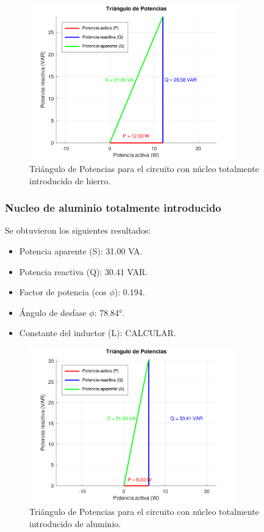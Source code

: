 \documentclass{article}
\begin{document}
            \begin{figure}[H]
                \centering
                \includegraphics[width=0.8\textwidth]{graficoTotalHierro.png}
                \caption{Triángulo de Potencias para el circuito con núcleo totalmente introducido de hierro.}
                \label{fig:graficoTotalHierro}
            \end{figure}


        \subsubsection{Nucleo de aluminio totalmente introducido}

                 Se obtuvieron los siguientes resultados:
            \begin{itemize}
                \item Potencia aparente (S): 31.00 VA.
                \item Potencia reactiva (Q): 30.41 VAR.
                \item Factor de potencia (cos $\phi$): 0.194.
                \item Ángulo de desfase $\phi$: 78.84°.
                \item Constante del inductor (L): CALCULAR.
            \end{itemize}

            \begin{figure}[H]
                \centering
                \includegraphics[width=0.8\textwidth]{graficoTotalAluminio.png}
                \caption{Triángulo de Potencias para el circuito con núcleo totalmente introducido de aluminio.}
                \label{fig:graficoTotalAluminio}
            \end{figure}
   
\end{document}
